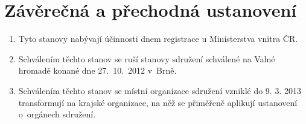 \documentclass[a4paper]{article}
\begin{document}
\section{Závěrečná a přechodná ustanovení}
    \begin{enumerate}
    \item Tyto stanovy nabývají účinnosti dnem registrace u Ministerstva
        vnitra ČR.

    \item Schválením těchto stanov se ruší stanovy sdružení schválené na
        Valné hromadě konané dne 27.~10.~2012 v~Brně.

    \item Schválením těchto stanov se místní organizace sdružení vzniklé do 9. 3. 2013
        transformují na krajské
        organizace, na něž se přiměřeně aplikují ustanovení o~orgánech sdružení.
    \end{enumerate}
\end{document}

